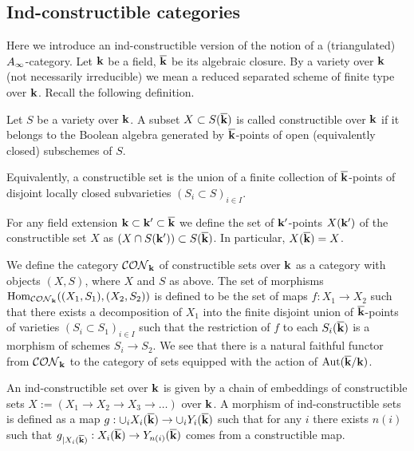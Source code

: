 \documentclass[12pt]{article}
\begin{document}
\subsection{Ind-constructible categories}

Here we introduce an ind-constructible version of the notion of a (triangulated)  $A_{\infty}$-category.
Let ${\bf k}$ be a field, $\overline{{\bf k}}$ be its algebraic closure. By a variety over ${\bf k}$ (not necessarily irreducible)
we mean a reduced separated scheme of finite type over ${\bf k}$. 
Recall  the following definition.

\begin{defn} Let $S$ be a variety over ${\bf k}$. A subset $X\subset S({\overline{\bf k}})$ is called constructible over ${\bf k}$ 
if it belongs to the Boolean algebra generated by ${\overline{\bf k}}$-points of open (equivalently closed) subschemes of $S$.

\end{defn}

Equivalently, a constructible set is the union of a finite collection  of ${\overline{\bf k}}$-points of
disjoint locally closed subvarieties $(S_i\subset S)_{i\in I}$.

For any field extension ${\bf k}\subset {\bf k}^{\prime}\subset {\overline{\bf k}}$ we define the set of ${\bf k}^{\prime}$-points $X({\bf k}')$ of the constructible set $X$
as $(X\cap S({\bf k}'))\subset S({\overline{\bf k}})$. In particular, $X({\overline{\bf k}})=X$.

We define the category ${\cal CON}_{{\bf k}}$ of constructible sets over ${\bf k}$ as a category with objects
$(X,S)$, where $X$ and $S$ as above. The set of morphisms $\operatorname{Hom}_{{\cal CON}_{{\bf k}}}((X_1,S_1),(X_2,S_2))$ is defined to be the set of maps  
 $f:X_1\to X_2$ such that there exists a decomposition of $X_1$ into the finite disjoint union of ${\overline{\bf k}}$-points of 
varieties $(S_i\subset S_1)_{i\in I}$ such that
 the restriction of $f$ to each $S_i({\overline{\bf k}})$ is a morphism of schemes $S_i\to S_2$.
We see that there is a natural faithful functor from ${\cal CON}_{{\bf k}}$ to the category of sets equipped with
the action of $\operatorname{Aut}(\overline{{\bf k}}/{\bf k})$.

\begin{defn} An ind-constructible set over ${\bf k}$ is given by a chain of embeddings of constructible sets
$X:=(X_1\to X_2\to X_3\to\dots)$ over ${\bf k}$. A morphism of ind-constructible sets  is defined as
a map $g:\cup_iX_i(\overline{{\bf k}})\to \cup_iY_i(\overline{{\bf k}})$ such that for any $i$ there exists $n(i)$ such  that
$g_{|X_i(\overline{{\bf k}})}:X_i(\overline{{\bf k}})\to Y_{n(i)}(\overline{{\bf k}})$ comes from a constructible map.


\end{defn}
\end{document}

